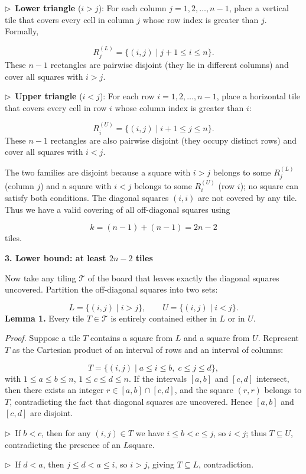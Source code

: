 \documentclass{llmxive}
\providecommand{\solutionheading}[1]{\par\smallskip\noindent\textbf{#1}\par}
\providecommand{\compactbullet}[1]{\par\noindent$\triangleright$~#1\par}
\begin{document}
\compactbullet{\textbf{Lower triangle} (\(i > j\)): For each column \(j = 1, 2, \dots, n-1\), place a vertical tile that covers every cell in column \(j\) whose row index is greater than \(j\). Formally,}
\[
  R^{(L)}_j = \{(i,j) \mid j+1 \le i \le n\}.
  \]
These \(n-1\) rectangles are pairwise disjoint (they lie in different columns) and cover all squares with \(i>j\).\par
\compactbullet{\textbf{Upper triangle} (\(i < j\)): For each row \(i = 1, 2, \dots, n-1\), place a horizontal tile that covers every cell in row \(i\) whose column index is greater than \(i\):}
\[
  R^{(U)}_i = \{(i,j) \mid i+1 \le j \le n\}.
  \]
These \(n-1\) rectangles are also pairwise disjoint (they occupy distinct rows) and cover all squares with \(i<j\).\par
The two families are disjoint because a square with \(i>j\) belongs to some \(R^{(L)}_j\) (column \(j\)) and a square with \(i<j\) belongs to some \(R^{(U)}_i\) (row \(i\)); no square can satisfy both conditions. The diagonal squares \((i,i)\) are not covered by any tile. Thus we have a valid covering of all off-diagonal squares using\par
\[
k = (n-1)+(n-1) = 2n-2
\]
tiles.\par
\smallskip
\solutionheading{3. Lower bound: at least \(2n-2\) tiles}
Now take any tiling \(\mathcal{T}\) of the board that leaves exactly the diagonal squares uncovered. Partition the off-diagonal squares into two sets:\par
\[
L = \{(i,j) \mid i > j\}, \qquad U = \{(i,j) \mid i < j\}.
\]
\textbf{Lemma 1.} Every tile \(T \in \mathcal{T}\) is entirely contained either in \(L\) or in \(U\).\par
\emph{Proof.} Suppose a tile \(T\) contains a square from \(L\) and a square from \(U\). Represent \(T\) as the Cartesian product of an interval of rows and an interval of columns:\par
\[
T = \{(i,j) \mid a \le i \le b,\; c \le j \le d\},
\]
with \(1 \le a \le b \le n\), \(1 \le c \le d \le n\). If the intervals \([a,b]\) and \([c,d]\) intersect, then there exists an integer \(r \in [a,b] \cap [c,d]\), and the square \((r,r)\) belongs to \(T\), contradicting the fact that diagonal squares are uncovered. Hence \([a,b]\) and \([c,d]\) are disjoint.\par
\compactbullet{If \(b < c\), then for any \((i,j) \in T\) we have \(i \le b < c \le j\), so \(i < j\); thus \(T \subseteq U\), contradicting the presence of an \(L\)square.}
\compactbullet{If \(d < a\), then \(j \le d < a \le i\), so \(i > j\), giving \(T \subseteq L\), contradiction.}
\end{document}
